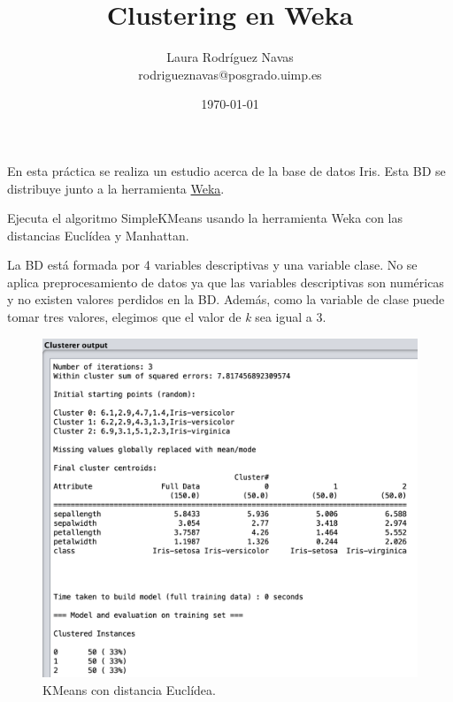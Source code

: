 \documentclass[11pt]{exam}
\title{Clustering en Weka}
\author{Laura Rodríguez Navas \\ rodrigueznavas@posgrado.uimp.es}
\date{\today}
\begin{document}
	
\maketitle

En esta práctica se realiza un estudio acerca de la base de datos Iris. Esta BD se distribuye junto a la herramienta \href{https://www.cs.waikato.ac.nz/ml/weka/}{Weka}. 

\begin{questions}
	
{\question Ejecuta el algoritmo SimpleKMeans usando la herramienta Weka con las distancias Euclídea y Manhattan.}

La BD está formada por 4 variables descriptivas y una variable clase. No se aplica preprocesamiento de datos ya que las variables descriptivas son numéricas y no existen valores perdidos en la BD. Además, como la variable de clase puede tomar tres valores, elegimos que el valor de \textit{k} sea igual a 3.

\renewcommand{\figurename}{Figura}

\begin{figure}[h]
	\centering
	\includegraphics[scale=0.4]{kmeans_euclidea.png}
	\caption{KMeans con distancia Euclídea.}
	\label{Captura_1}
\end{figure}



\end{questions}
\end{document}

